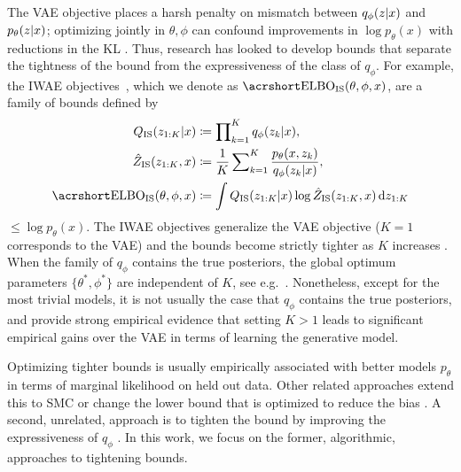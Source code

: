 The \gls{VAE} objective places a harsh penalty on mismatch between $q_{\phi}(z \lvert x)$ and $p_{\theta}(z \lvert x)$; optimizing jointly in $\theta, \phi$ can confound improvements in $\log p_{\theta}(x)$ with reductions in the KL \citep{Turner2011two}. Thus, research has looked to develop bounds that separate the tightness of the bound from the expressiveness of the class of $q_{\phi}$. For example, the \gls{IWAE} objectives~\citep{Burda2016importance}, which we
denote as $\ELBO_{\text{IS}}(\theta, \phi, x)$, are a family of bounds defined by
\begin{align}
	Q_{\text{IS}}(z_{1:K} \given x) &\coloneqq \prod\nolimits_{k = 1}^K q_{\phi}(z_k \given x), \nonumber
	\\
	\hat Z_{\text{IS}}(z_{1:K}, x) &\coloneqq \frac{1}{K}\sum\nolimits_{k = 1}^K \frac{p_{\theta}(x, z_k)}{q_{\phi}(z_k \given x)}, \label{eq:background/q_is_z_is}\\
	\ELBO_{\text{IS}}(\theta, \phi, x) &\coloneqq \int Q_{\text{IS}}(z_{1:K} \given x) \log \hat Z_{\text{IS}}(z_{1:K}, x) \,\mathrm dz_{1:K}
	\nonumber
\end{align}
$\leq \log p_{\theta}(x)$.
The \gls{IWAE} objectives generalize the \gls{VAE} objective ($K=1$ corresponds to the \gls{VAE}) and the bounds become strictly tighter as $K$ increases \cite{Burda2016importance}. When the family of $q_{\phi}$ contains the true posteriors, the global optimum parameters $\{\theta^*,\phi^*\}$ are independent of $K$, see e.g.~\cite{Le2017auto}. Nonetheless, except for the most trivial models, it is not usually the case that $q_{\phi}$ contains the true posteriors, and \citet{Burda2016importance} provide strong empirical evidence that setting
$K>1$ leads to significant empirical gains over the \gls{VAE} in terms of learning the
generative model. 

Optimizing tighter bounds is usually empirically associated with 
better models $p_{\theta}$ in 
terms of marginal likelihood on held out data.
Other related approaches extend this to \gls{SMC} \citep{maddison2017filtering, Le2017auto,naesseth2017variational} or change the lower bound that is optimized to reduce the bias \citep{Li2016renyi,Bamler2017perturbative}.
A second, unrelated, approach is to tighten the bound by improving the expressiveness of $q_{\phi}$ \citep{salimans_markov_2015, tran_variational_2015, rezende_variational_2015, kingma2016improving, maaloe_auxiliary_2016, ranganath2016hierarchical}.
In this work, we focus on the former, algorithmic, approaches to tightening bounds. 

